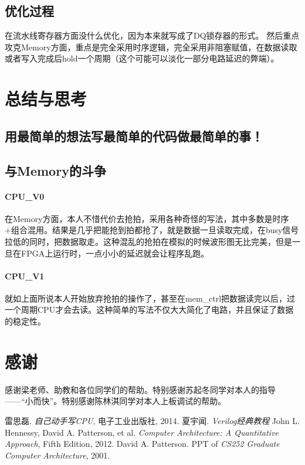 \documentclass[a4paper,10pt,oneside]{article}
\begin{document}
\subsection{优化过程} 在流水线寄存器方面没什么优化，因为本来就写成了DQ锁存器的形式。 然后重点攻克Memory方面，重点是完全采用时序逻辑，完全采用非阻塞赋值，在数据读取或者写入完成后hold一个周期（这个可能可以淡化一部分电路延迟的弊端）。

\section{总结与思考}
\subsection{用最简单的想法写最简单的代码做最简单的事！} 

\subsection{与Memory的斗争} 
\paragraph{CPU\_V0}在Memory方面，本人不惜代价去抢拍，采用各种奇怪的写法，其中多数是时序+组合混用。结果是几乎把能抢到拍都抢了，就是数据一旦读取完成，在busy信号拉低的同时，把数据取走。这种混乱的抢拍在模拟的时候波形图无比完美，但是一旦在FPGA上运行时，一点小小的延迟就会让程序乱跑。

\paragraph{CPU\_V1}就如上面所说本人开始放弃抢拍的操作了，甚至在mem\_ctrl把数据读完以后，过一个周期CPU才会去读。这种简单的写法不仅大大简化了电路，并且保证了数据的稳定性。

\section{感谢}
感谢梁老师、助教和各位同学们的帮助。特别感谢苏起冬同学对本人的指导——“小而快”。特别感谢陈林淇同学对本人上板调试的帮助。
\begin{thebibliography}{9}
    雷思磊.
    \emph{自己动手写CPU},
    电子工业出版社, 2014.
    夏宇闻.
    \emph{Verilog经典教程}
  John L. Hennessy, David A. Patterson, et al.
  \emph{Computer Architecture: A Quantitative Approach},
  Fifth Edition, 2012.
  David A. Patterson.
  PPT of \emph{CS252 Graduate Computer Architecture},
  2001.
  
\end{thebibliography}
\end{document}

